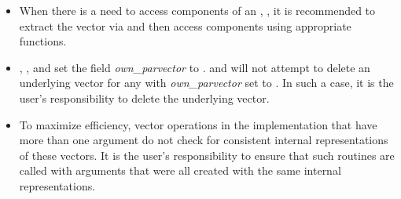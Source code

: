 \begin{itemize}
                                        
\item
  When there is a need to access components of an , , 
  it is recommended to extract the {\hypre} vector via       
   and then access components using 
  appropriate {\hypre} functions.        
                                                               
\item
  {\warn}, , 
  and  set the field 
  {\em own\_parvector} to . 
   and 
  will not attempt to delete an underlying {\hypre} vector for any  
  with {\em own\_parvector} set to . In such a case, it is the 
  user's responsibility to delete the underlying vector.

\item
  {\warn}To maximize efficiency, vector operations in the {\nvecph} implementation
  that have more than one  argument do not check for
  consistent internal representations of these vectors. It is the user's 
  responsibility to ensure that such routines are called with 
  arguments that were all created with the same internal representations.

\end{itemize}

% 
